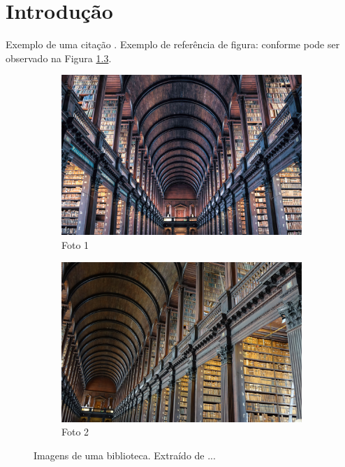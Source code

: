 \chapter[Introdução]{Introdução}
\label{chap:introduction}

Exemplo de uma citação \cite{HennessyPatterson2012}. Exemplo de referência de
figura: conforme pode ser observado na Figura \ref{fig:biblioteca}.

\lipsum [5 - 10]

\begin{figure}[t]
  \begin{subfigure}{.5\linewidth}
    \centering
    \includegraphics[width=\textwidth]{images/library1.jpg}
    \caption{Foto 1}
    \label{fig:foto1}
  \end{subfigure}
  \begin{subfigure}{.5\linewidth}
    \centering
    \includegraphics[width=\textwidth]{images/library2.jpg}
    \caption{Foto 2}
    \label{fig:foto2}
  \end{subfigure}
  \caption{Imagens de uma biblioteca. Extraído de ...}
  \label{fig:biblioteca}
\end{figure}


